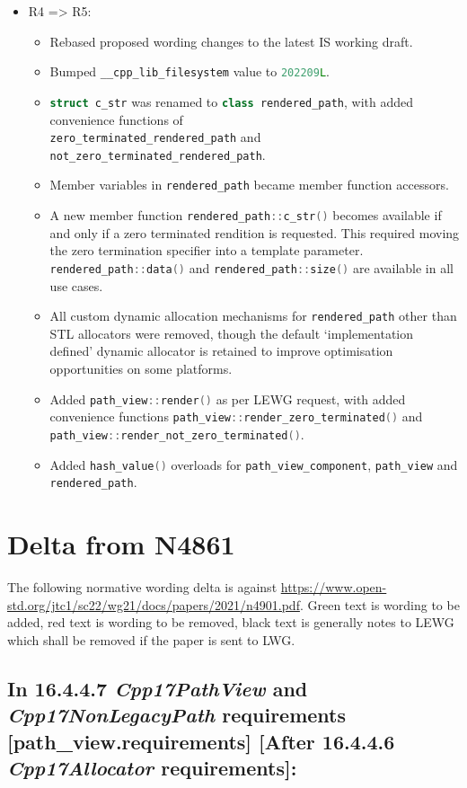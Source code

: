 \documentclass[11pt]{article}
\newcommand{\code}[2][cpp]{\lstinline[language=#1,basicstyle=\small\ttfamily]{#2}}
\newcommand{\tsref}[2]{\subsection*{In #2 \textbf{[#1]}:}}
\begin{document}
\begin{itemize}
    \item R4 => R5:
    \begin{itemize}
        \item Rebased proposed wording changes to the latest IS working draft.
        \item Bumped \code{__cpp_lib_filesystem} value to \code{202209L}.
        \item \code{struct c_str} was renamed to \code{class rendered_path}, with added convenience functions of \\
        \code{zero_terminated_rendered_path} and \code{not_zero_terminated_rendered_path}.
        \item Member variables in \code{rendered_path} became member function accessors.
        \item A new member function \code{rendered_path::c_str()} becomes available if and only if a zero terminated rendition is requested. This required moving the zero termination specifier into a template parameter. \code{rendered_path::data()} and \code{rendered_path::size()} are available in all use cases.
        \item All custom dynamic allocation mechanisms for \code{rendered_path} other than STL allocators were removed, though the default `implementation defined' dynamic allocator is retained to improve optimisation opportunities on some platforms.
        \item Added \code{path_view::render()} as per LEWG request, with added convenience functions \code{path_view::render_zero_terminated()} and \code{path_view::render_not_zero_terminated()}.
        \item Added \code{hash_value()} overloads for \code{path_view_component}, \code{path_view} and \code{rendered_path}.
    \end{itemize}
\end{itemize}

\section{Delta from N4861}

The following normative wording delta is against \url{https://www.open-std.org/jtc1/sc22/wg21/docs/papers/2021/n4901.pdf}. Green text is wording to be added, red text is wording to be removed, black text is generally notes to LEWG which shall be removed if the paper is sent to LWG.

\tsref{After 16.4.4.6 \emph{Cpp17Allocator} requirements}{16.4.4.7 \emph{Cpp17PathView} and \emph{Cpp17NonLegacyPath} requirements [path\_view.requirements]}
\end{document}
